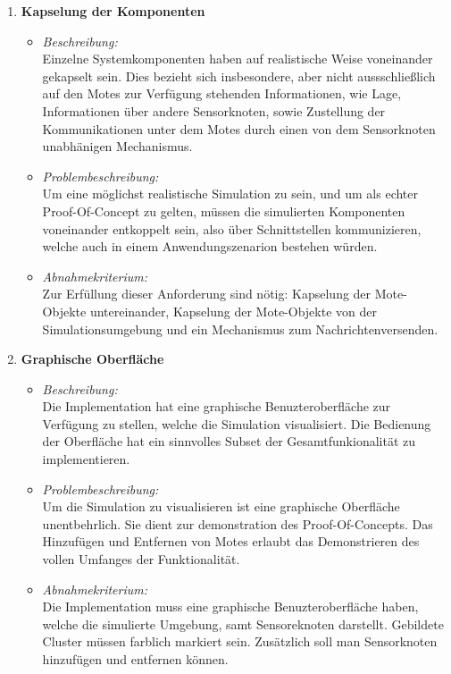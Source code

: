 \begin{enumerate}
\item \textbf{Kapselung der Komponenten}
  \begin{itemize}
  \item \emph{Beschreibung:}\\
    Einzelne Systemkomponenten haben auf realistische Weise voneinander gekapselt sein.
    Dies bezieht sich insbesondere, aber nicht aussschlie\ss lich auf den Motes zur Verf\"ugung stehenden Informationen, wie Lage, Informationen \"uber andere Sensorknoten, sowie Zustellung der Kommunikationen unter dem Motes durch einen von dem Sensorknoten unabh\"anigen Mechanismus.
  \item \emph{Problembeschreibung:}\\
Um eine m\"oglichst realistische Simulation zu sein, und um als echter Proof-Of-Concept zu gelten, m\"ussen die simulierten Komponenten voneinander entkoppelt sein, also \"uber Schnittstellen kommunizieren, welche auch in einem Anwendungszenarion bestehen w\"urden.
  \item \emph{Abnahmekriterium:}\\
    Zur Erf\"ullung dieser Anforderung sind n\"otig: Kapselung der Mote-Objekte untereinander, Kapselung der Mote-Objekte von der Simulationsumgebung und ein Mechanismus zum Nachrichtenversenden.
  \end{itemize}
\item \textbf{Graphische Oberfl\"ache}
  \begin{itemize}
  \item \emph{Beschreibung:}\\
    Die Implementation hat eine graphische Benuzteroberfl\"ache zur Verf\"ugung zu stellen, welche die Simulation visualisiert. Die Bedienung der Oberfl\"ache hat ein sinnvolles Subset der Gesamtfunkionalit\"at zu implementieren.
  \item \emph{Problembeschreibung:}\\
    Um die Simulation zu visualisieren ist eine graphische Oberfl\"ache unentbehrlich. Sie dient zur demonstration des Proof-Of-Concepts. Das Hinzuf\"ugen und Entfernen von Motes erlaubt das Demonstrieren des vollen Umfanges der Funktionalit\"at.
  \item \emph{Abnahmekriterium:}\\
    Die Implementation muss eine graphische Benuzteroberfl\"ache haben, welche die simulierte Umgebung, samt Sensoreknoten darstellt. Gebildete Cluster m\"ussen farblich markiert sein. Zus\"atzlich soll man Sensorknoten hinzuf\"ugen und entfernen k\"onnen.
  \end{itemize}
\end{enumerate}

